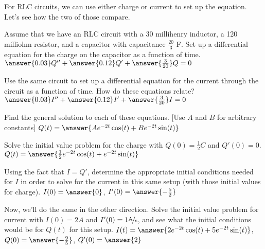 \documentclass{ximera}
\begin{document}
\begin{exercise}
    For RLC circuits, we can use either charge or current to set up the equation. Let's see how the two of those compare.
    
    Assume that we have an RLC circuit with a 30 millihenry inductor, a 120 milliohm resistor, and a capacitor with capacitance $\frac{20}{3}$ F. Set up a differential equation for the charge on the capacitor as a function of time.
    $\answer{0.03}Q'' + \answer{0.12}Q' + \answer{\frac{3}{20}}Q = 0$
    \begin{problem} 
        Use the same circuit to set up a differential equation for the current through the circuit as a function of time. How do these equations relate? $\answer{0.03}I'' + \answer{0.12}I' + \answer{\frac{3}{20}}I = 0$
        \begin{problem}
            Find the general solution to each of these equations. [Use $A$ and $B$ for arbitrary constants] $Q(t) = \answer{Ae^{-2t}\cos(t) + Be^{-2t}\sin(t)}$
            \begin{problem}
                Solve the initial value problem for the charge with $Q(0) = \frac{1}{2} C$ and $Q'(0) = 0$. $Q(t) = \answer{\frac{1}{2}e^{-2t}\cos(t) + e^{-2t}\sin(t)}$
                \begin{problem}
                    Using the fact that $I = Q'$, determine the appropriate initial conditions needed for $I$ in order to solve for the current in this same setup (with those initial values for charge). $I(0) = \answer{0}$, $I'(0) = \answer{-\frac{5}{2}}$
                    \begin{problem}
                        Now, we'll do the same in the other direction. Solve the initial value problem for current with $I(0) = 2 A$ and $I'(0) = 1 \unitfrac{A}{s}$, and see what the initial conditions would be for $Q(t)$ for this setup.
                        $I(t) = \answer{2e^{-2t}\cos(t) + 5e^{-2t}\sin(t)}$, $Q(0) = \answer{-\frac{9}{5}}$, $Q'(0) = \answer{2}$
                    \end{problem}
                \end{problem}
            \end{problem}
        \end{problem}
    \end{problem}
\end{exercise}
\end{document}
